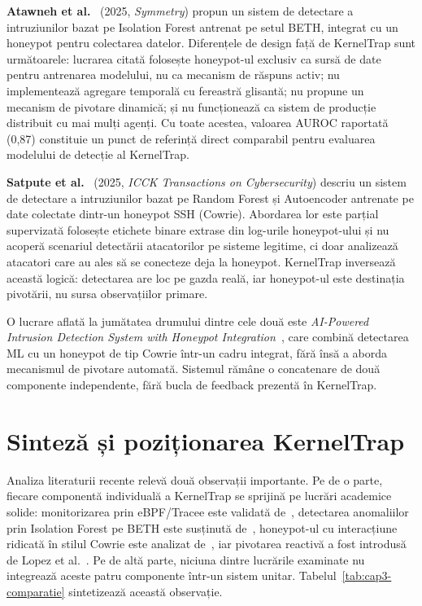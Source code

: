 \textbf{Atawneh et al.}~\cite{atawneh2025symmetry} (2025, \textit{Symmetry})
propun un sistem de detectare a intruziunilor bazat pe Isolation Forest antrenat
pe setul BETH, integrat cu un honeypot pentru colectarea datelor.
Diferențele de design față de KernelTrap sunt următoarele: lucrarea citată
folosește honeypot-ul exclusiv ca sursă de date pentru antrenarea modelului, nu
ca mecanism de răspuns activ; nu implementează agregare temporală cu fereastră
glisantă; nu propune un mecanism de pivotare dinamică; și nu funcționează ca
sistem de producție distribuit cu mai mulți agenți.
Cu toate acestea, valoarea AUROC raportată (0,87) constituie un punct de
referință direct comparabil pentru evaluarea modelului de detecție al
KernelTrap.

\textbf{Satpute et al.}~\cite{satpute2025aidriven} (2025,
\textit{ICCK Transactions on Cybersecurity}) descriu un sistem de detectare a
intruziunilor bazat pe Random Forest și Autoencoder antrenate pe date colectate
dintr-un honeypot SSH (Cowrie).
Abordarea lor este parțial supervizată folosește etichete binare extrase
din log-urile honeypot-ului și nu acoperă scenariul detectării atacatorilor
pe sisteme legitime, ci doar analizează atacatori care au ales să se conecteze
deja la honeypot.
KernelTrap inversează această logică: detectarea are loc pe gazda reală, iar
honeypot-ul este destinația pivotării, nu sursa observațiilor primare.

O lucrare aflată la jumătatea drumului dintre cele două este
\textit{AI-Powered Intrusion Detection System with Honeypot
Integration}~\cite{aipoweredids2025}, care combină detectarea ML cu un honeypot
de tip Cowrie într-un cadru integrat, fără însă a aborda mecanismul de pivotare
automată.
Sistemul rămâne o concatenare de două componente independente, fără bucla de
feedback prezentă în KernelTrap.

\section{Sinteză și poziționarea KernelTrap}

Analiza literaturii recente relevă două observații importante.
Pe de o parte, fiecare componentă individuală a KernelTrap se sprijină pe
lucrări academice solide: monitorizarea prin eBPF/Tracee este validată
de~\cite{soldani2023ebpf,hao2024ebpfruntime,syairozi2025ebpfcomparative,fournier2021ebpf},
detectarea anomaliilor prin Isolation Forest pe BETH este susținută
de~\cite{highnam2021beth,liu2008iforest,atawneh2025symmetry,eremin2025streams},
honeypot-ul cu interacțiune ridicată în stilul Cowrie este analizat
de~\cite{qcowrie2026,sladic2024llm,honeypotsurvey2025},
iar pivotarea reactivă a fost introdusă de Lopez
et al.~\cite{lopez2024tcpredirection}.
Pe de altă parte, niciuna dintre lucrările examinate nu integrează aceste patru
componente într-un sistem unitar.
Tabelul~\ref{tab:cap3-comparatie} sintetizează această observație.

